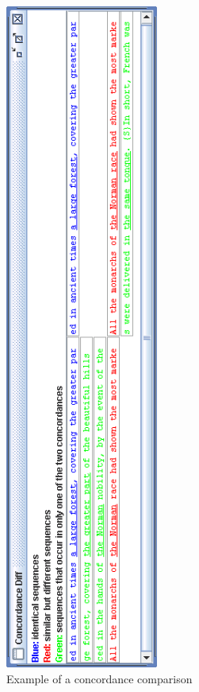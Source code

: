 \bigskip
\begin{figure}[h]
\begin{center}
\includegraphics[height=22cm]{resources/img/fig6-33.png}
\caption{Example of a concordance comparison\label{fig-concordiff}}
\end{center}
\end{figure}


